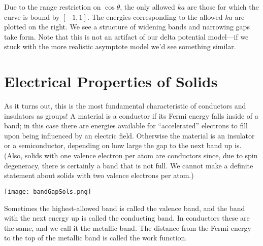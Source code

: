 \documentclass[../p052main.tex]{subfiles}
\begin{document}
Due to the range restriction on $\cos \theta$, the only allowed $ka$ are those for which the curve is bound by $[-1, 1]$.
The energies corresponding to the allowed $ka$ are plotted on the right.
We see a structure of widening bands and narrowing gaps take form.
Note that this is not an artifact of our delta potential model---if we stuck with the more realistic asymptote model we'd see something similar.

\section{Electrical Properties of Solids}
As it turns out, this is the most fundamental characteristic of conductors and insulators as groups!
A material is a conductor if its Fermi energy falls inside of a band; in this case there are energies available for ``accelerated'' electrons to fill upon being influenced by an electric field.
Otherwise the material is an insulator or a semiconductor, depending on how large the gap to the next band up is.
(Also, solids with one valence electron per atom are conductors since, due to spin degeneracy, there is certainly a band that is not full.
We cannot make a definite statement about solids with two valence electrons per atom.)

\begin{center}
    \texttt{[image: bandGapSols.png]}
\end{center}


Sometimes the highest-allowed band is called the valence band, and the band with the next energy up is called the conducting band.
In conductors these are the same, and we call it the metallic band.
The distance from the Fermi energy to the top of the metallic band is called the work function.
\end{document}

